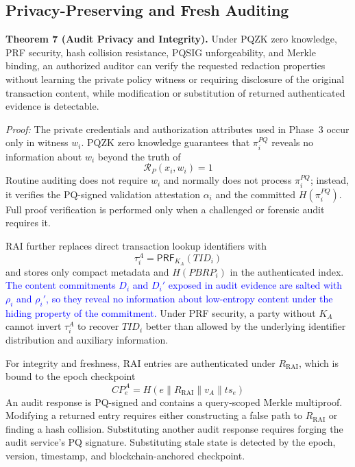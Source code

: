 \documentclass[lettersize,journal]{IEEEtran}
\begin{document}
\subsection{Privacy-Preserving and Fresh Auditing}

\textbf{Theorem 7 (Audit Privacy and Integrity).}
Under PQZK zero knowledge, PRF security, hash collision resistance,
PQSIG unforgeability, and Merkle binding, an authorized auditor can
verify the requested redaction properties without learning the
private policy witness or requiring disclosure of the original
transaction content, while modification or substitution of returned
authenticated evidence is detectable.

\emph{Proof:}
The private credentials and authorization attributes used in
Phase~3 occur only in witness $w_i$. PQZK zero knowledge guarantees
that $\pi_i^{PQ}$ reveals no information about $w_i$ beyond the truth
of
\begin{equation}
\mathcal{R}_{P}(x_i,w_i)=1
\label{eq:sec_zk_privacy}
\end{equation}
Routine auditing does not require $w_i$ and normally does not process
$\pi_i^{PQ}$; instead, it verifies the PQ-signed validation
attestation $\alpha_i$ and the committed $H(\pi_i^{PQ})$. Full proof
verification is performed only when a challenged or forensic audit
requires it.

RAI further replaces direct transaction lookup identifiers with
\begin{equation}
\tau_i^A=\mathsf{PRF}_{K_A}(TID_i)
\label{eq:sec_rai_token}
\end{equation}
and stores only compact metadata and $H(PBRP_i)$ in the authenticated
index. \textcolor{blue}{The content commitments $D_i$ and $D_i'$ exposed
in audit evidence are salted with $\rho_i$ and $\rho_i'$, so they reveal
no information about low-entropy content under the hiding property of
the commitment.} Under PRF security, a party without $K_A$ cannot invert
$\tau_i^A$ to recover $TID_i$ better than allowed by the underlying
identifier distribution and auxiliary information.

For integrity and freshness, RAI entries are authenticated under
$R_{\mathrm{RAI}}$, which is bound to the epoch checkpoint
\begin{equation}
CP_e^A=
H(e\parallel R_{\mathrm{RAI}}\parallel v_A\parallel ts_e)
\label{eq:sec_audit_cp}
\end{equation}
An audit response is PQ-signed and contains a query-scoped Merkle
multiproof. Modifying a returned entry requires either constructing a
false path to $R_{\mathrm{RAI}}$ or finding a hash collision.
Substituting another audit response requires forging the audit
service's PQ signature. Substituting stale state is detected by the
epoch, version, timestamp, and blockchain-anchored checkpoint.
\end{document}
